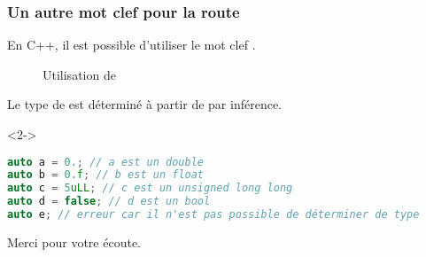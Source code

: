 \documentclass{cppcourses}
\begin{document}
\begin{frame}[fragile]

\frametitle{Un autre mot clef pour la route}

En C++, il est possible d'utiliser le mot clef  .

\begin{figure}
\caption{Utilisation de }
\end{figure}

Le type de \mykeyword{\textcolor{blue}{identifiant}} est déterminé à partir de \mykeyword{\textcolor{teal}{autre}} par inférence.

\begin{example}<2->

\begin{lstlisting}[language = c++]
auto a = 0.; // a est un double
auto b = 0.f; // b est un float
auto c = 5uLL; // c est un unsigned long long
auto d = false; // d est un bool
auto e; // erreur car il n'est pas possible de déterminer de type
\end{lstlisting}

\end{example}

\end{frame}

\begin{frame}

\centering\Large

Merci pour votre écoute.

\end{frame}
\end{document}

